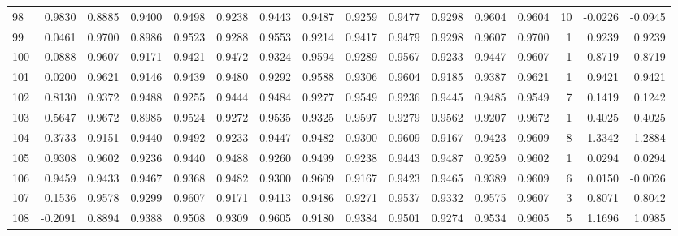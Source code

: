 \begin{tabular}{lrrrrrrrrrrrrrrr}
98  &      0.9830 &  0.8885 &  0.9400 &  0.9498 &  0.9238 &  0.9443 &  0.9487 &  0.9259 &  0.9477 &  0.9298 &   0.9604 &     0.9604 &     10 &                   -0.0226 &                    -0.0945 \\
99  &      0.0461 &  0.9700 &  0.8986 &  0.9523 &  0.9288 &  0.9553 &  0.9214 &  0.9417 &  0.9479 &  0.9298 &   0.9607 &     0.9700 &      1 &                    0.9239 &                     0.9239 \\
100 &      0.0888 &  0.9607 &  0.9171 &  0.9421 &  0.9472 &  0.9324 &  0.9594 &  0.9289 &  0.9567 &  0.9233 &   0.9447 &     0.9607 &      1 &                    0.8719 &                     0.8719 \\
101 &      0.0200 &  0.9621 &  0.9146 &  0.9439 &  0.9480 &  0.9292 &  0.9588 &  0.9306 &  0.9604 &  0.9185 &   0.9387 &     0.9621 &      1 &                    0.9421 &                     0.9421 \\
102 &      0.8130 &  0.9372 &  0.9488 &  0.9255 &  0.9444 &  0.9484 &  0.9277 &  0.9549 &  0.9236 &  0.9445 &   0.9485 &     0.9549 &      7 &                    0.1419 &                     0.1242 \\
103 &      0.5647 &  0.9672 &  0.8985 &  0.9524 &  0.9272 &  0.9535 &  0.9325 &  0.9597 &  0.9279 &  0.9562 &   0.9207 &     0.9672 &      1 &                    0.4025 &                     0.4025 \\
104 &     -0.3733 &  0.9151 &  0.9440 &  0.9492 &  0.9233 &  0.9447 &  0.9482 &  0.9300 &  0.9609 &  0.9167 &   0.9423 &     0.9609 &      8 &                    1.3342 &                     1.2884 \\
105 &      0.9308 &  0.9602 &  0.9236 &  0.9440 &  0.9488 &  0.9260 &  0.9499 &  0.9238 &  0.9443 &  0.9487 &   0.9259 &     0.9602 &      1 &                    0.0294 &                     0.0294 \\
106 &      0.9459 &  0.9433 &  0.9467 &  0.9368 &  0.9482 &  0.9300 &  0.9609 &  0.9167 &  0.9423 &  0.9465 &   0.9389 &     0.9609 &      6 &                    0.0150 &                    -0.0026 \\
107 &      0.1536 &  0.9578 &  0.9299 &  0.9607 &  0.9171 &  0.9413 &  0.9486 &  0.9271 &  0.9537 &  0.9332 &   0.9575 &     0.9607 &      3 &                    0.8071 &                     0.8042 \\
108 &     -0.2091 &  0.8894 &  0.9388 &  0.9508 &  0.9309 &  0.9605 &  0.9180 &  0.9384 &  0.9501 &  0.9274 &   0.9534 &     0.9605 &      5 &                    1.1696 &                     1.0985 \\

\end{tabular}
